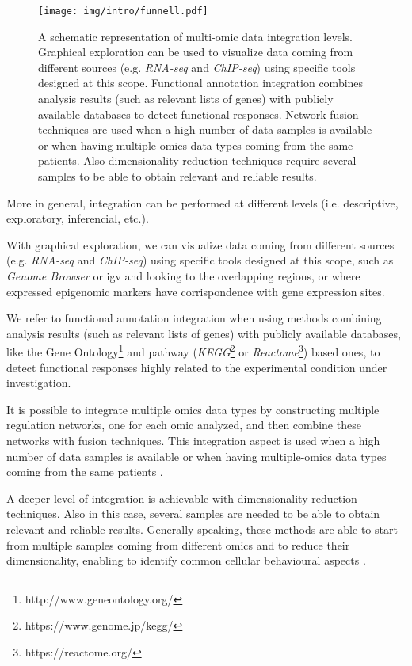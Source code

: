 \begin{figure}[h]
\centering
\texttt{[image: img/intro/funnell.pdf]}
\caption[Integration Funnell]{A schematic representation of multi-omic data integration levels.
Graphical exploration can be used to visualize data coming from different sources (e.g. \textit{RNA-seq} and \textit{ChIP-seq}) using specific tools designed at this scope.
Functional annotation integration combines analysis results (such as relevant lists of genes) with publicly available databases to detect functional responses.
Network fusion techniques are used when a high number of data samples is available or when having multiple-omics data types coming from the same patients.
Also dimensionality reduction techniques require several samples to be able to obtain relevant and reliable results.
}
\label{fig:funnell}
\end{figure}

More in general, integration can be performed at different levels (i.e. descriptive, exploratory, inferencial, etc.).

With graphical exploration, we can visualize data coming from different sources (e.g. \textit{RNA-seq} and \textit{ChIP-seq}) using specific tools designed at this scope, such as \textit{Genome Browser} \cite{Karolchik2011} or \gls{igv} \cite{Robinson2011, Thorvaldsdottir2013} and looking to the overlapping regions, or where expressed epigenomic markers have corrispondence with gene expression sites.

We refer to functional annotation integration when using methods combining analysis results (such as relevant lists of genes) with publicly available databases,  like the Gene Ontology\footnote{http://www.geneontology.org/} and pathway (\textit{KEGG}\footnote{https://www.genome.jp/kegg/} or \textit{Reactome}\footnote{https://reactome.org/}) based ones, to detect functional responses highly related to the experimental condition under investigation.

It is possible to integrate multiple omics data types by constructing multiple regulation networks, one for each omic analyzed, and then combine these networks with fusion techniques.
This integration aspect is used when a high number of data samples is available or when having multiple-omics data types coming from the same patients \cite{Wang2014}.

A deeper level of integration is achievable with dimensionality reduction techniques. 
Also in this case, several samples are needed to be able to obtain relevant and reliable results.
Generally speaking, these methods are able to start from multiple samples coming from different omics and to reduce their dimensionality, enabling to identify common cellular behavioural aspects \cite{Rohart2017, Argelaguet2018}.




